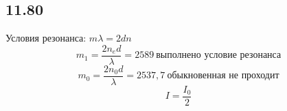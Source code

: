 \subsection*{11.80}
Условия резонанса: $m\lambda = 2 d n$
$$m_1 = \frac{2n_e d }{\lambda} = 2589 \ \text{выполнено условие резонанса}$$
$$m_0 = \frac{2n_0 d}{\lambda} = 2537,7 \ \text{обыкновенная не проходит}$$
$$I = \frac{I_0}{2}$$
